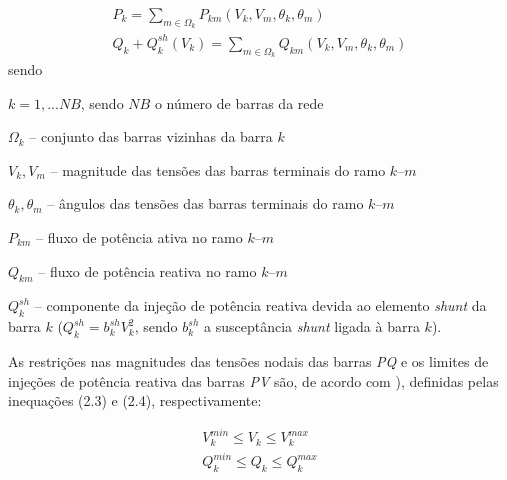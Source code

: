 \documentclass[12pt,oneside,a4paper,chapter=TITLE,section=TITLE,sumario=tradicional,english,brazil]{abntex2}
\begin{document}
\begin{gather}
P_{k}=\displaystyle\sum_{m\in\Omega_k} P_{km}(V_{k}, V_{m}, \theta_{k}, \theta_{m})\\
Q_{k}+Q_{k}^{sh}(V_{k})=\displaystyle\sum_{m\in\Omega_{k}} Q_{km}(V_{k}, V_{m}, \theta_{k}, \theta_{m})
\end{gather}
sendo\par 
$k=1, ... NB$, sendo $NB$ o número de barras da rede\par 
$\Omega_{k}$ -- conjunto das barras vizinhas da barra $k$\par 
$V_{k}, V_{m}$ -- magnitude das tensões das barras terminais do ramo $k$--$m$\par 
$\theta_{k}, \theta_{m}$ -- ângulos das tensões das barras terminais do ramo $k$--$m$\par 
$P_{km}$ -- fluxo de potência ativa no ramo $k$--$m$\par 
$Q_{km}$ -- fluxo de potência reativa no ramo $k$--$m$\par 
$Q_{k}^{sh}$ -- componente da injeção de potência reativa devida ao elemento \textit{shunt} da barra $k$ ($Q_{k}^{sh}=b_{k}^{sh}V_{k}^2$, sendo $b_{k}^{sh}$ a susceptância \textit{shunt} ligada à barra $k$).\par 
As restrições nas magnitudes das tensões nodais das barras \textit{PQ} e os limites de injeções de potência reativa das barras \textit{PV} são, de acordo com \textcite{monticelli1983}), definidas pelas inequações (2.3) e (2.4), respectivamente:\par 
\begin{gather}
V_{k}^{min}\leq V_{k}\leq V_{k}^{max}\\
Q_{k}^{min}\leq Q_{k}\leq Q_{k}^{max} 
\end{gather}




	
\end{document}
